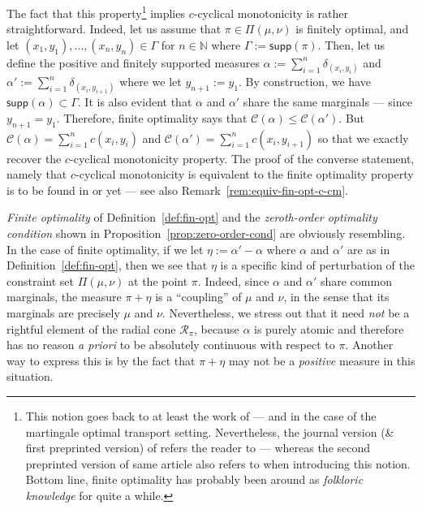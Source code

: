 \documentclass[leqno, 11pt, a4paper]{amsart}
\theoremstyle{definition}
\newcommand{\cR}{\mathcal{R}}
\newcommand{\C}{\mathscr{C}}
\newcommand{\N}{\mathbb{N}}
\newcommand{\supp}{\textsf{supp}}
\begin{document}
The fact that this property\footnote{This notion goes back to at least the work of \textcite{beiglbockLandMonotonePlenty2019b} — and \cite{beiglbockProblemOptimalTransport2016} in the case of the martingale optimal transport setting. Nevertheless, the journal version (\& first preprinted version) of \cite{beiglbockLandMonotonePlenty2019b} refers the reader to \cite[Ex. 2.21]{villani_optimal_2009} — whereas the second preprinted version of same article also refers to \cite{GradientFlows2008a} when introducing this notion. Bottom line, finite optimality has probably been around as \textit{folkloric knowledge} for quite a while.} implies $c$-cyclical monotonicity is rather straightforward. Indeed, let us assume that $\pi \in \Pi(\mu, \nu)$ is finitely optimal, and let $(x_1, y_1), \dots, (x_n, y_n) \in \Gamma$ for $n \in \N$ where $\Gamma := \supp(\pi)$. Then, let us define the positive and finitely supported measures $\alpha := \sum_{i = 1}^n \delta_{(x_i, y_i)}$ and $\alpha' := \sum_{i = 1}^n \delta_{(x_i, y_{i+1})}$ where we let $y_{n+1} := y_1$. By construction, we have $\supp(\alpha) \subset \Gamma$. It is also evident that $\alpha$ and $\alpha'$ share the same marginals — since $y_{n+1} = y_1$. Therefore, finite optimality says that $\C(\alpha) \leq \C(\alpha')$. But $\C(\alpha) = \sum_{i=1}^n c(x_i, y_i)$ and $\C(\alpha') = \sum_{i=1}^n c(x_i, y_{i+1})$ so that we exactly recover the $c$-cyclical monotonicity property.  The proof of the converse statement, namely that $c$-cyclical monotonicity is equivalent to the finite optimality property is to be found in \cite[Prop. 1.6]{pascaleSufficiencyCyclicalMonotonicity2025} or yet \cite{depascale60YearsCyclic2025} --- see also Remark~\ref{rem:equiv-fin-opt-c-cm}.

	\textit{Finite optimality} of Definition~\ref{def:fin-opt} and the \textit{zeroth-order optimality condition} shown in Proposition~\ref{prop:zero-order-cond} are obviously resembling. In the case of finite optimality, if we let $\eta := \alpha' - \alpha$ where $\alpha$ and $\alpha'$ are as in Definition~\ref{def:fin-opt}, then we see that $\eta$ is a specific kind of perturbation of the constraint set $\Pi(\mu, \nu)$ at the point $\pi$. Indeed, since $\alpha$ and $\alpha'$ share common marginals, the measure $\pi + \eta$ is a ``coupling'' of $\mu$ and $\nu$, in the sense that its marginals are precisely $\mu$ and $\nu$. Nevertheless, we stress out that it need \textit{not} be a rightful element of the radial cone $\cR_\pi$, because $\alpha$ is purely atomic and therefore has no reason \textit{a priori} to be absolutely continuous with respect to $\pi$. Another way to express this is by the fact that $\pi + \eta$ may not be a \textit{positive} measure in this situation.
 
\end{document}
